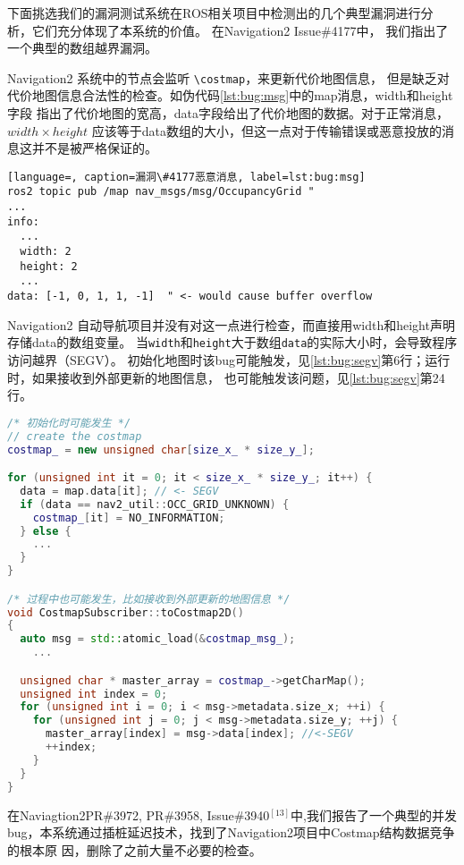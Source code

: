下面挑选我们的漏洞测试系统在ROS相关项目中检测出的几个典型漏洞进行分析，它们充分体现了本系统的价值。
在Navigation2 Issue\#4177中，
我们指出了一个典型的数组越界漏洞。

Navigation2 系统中的节点会监听 \texttt{\textbackslash costmap}，来更新代价地图信息，
但是缺乏对代价地图信息合法性的检查。如伪代码\ref{lst:bug:msg}中的map消息，width和height字段
指出了代价地图的宽高，data字段给出了代价地图的数据。对于正常消息，$width\times height$ 
应该等于data数组的大小，但这一点对于传输错误或恶意投放的消息这并不是被严格保证的。

\begin{lstlisting}[language=, caption=漏洞\#4177恶意消息, label=lst:bug:msg]
ros2 topic pub /map nav_msgs/msg/OccupancyGrid "
...
info:
  ...
  width: 2
  height: 2
  ...
data: [-1, 0, 1, 1, -1]  " <- would cause buffer overflow
\end{lstlisting}

Navigation2 自动导航项目并没有对这一点进行检查，而直接用width和height声明存储data的数组变量。
当\texttt{width}和\texttt{height}大于数组\texttt{data}的实际大小时，会导致程序访问越界（SEGV）。
初始化地图时该bug可能触发，见\ref{lst:bug:segv}第6行；运行时，如果接收到外部更新的地图信息，
也可能触发该问题，见\ref{lst:bug:segv}第24行。

\begin{lstlisting}[language=C++, caption=漏洞\#4177问题代码, label=lst:bug:segv]
/* 初始化时可能发生 */
// create the costmap
costmap_ = new unsigned char[size_x_ * size_y_];

for (unsigned int it = 0; it < size_x_ * size_y_; it++) {
  data = map.data[it]; // <- SEGV
  if (data == nav2_util::OCC_GRID_UNKNOWN) {
    costmap_[it] = NO_INFORMATION;
  } else {
    ...
  }
}

/* 过程中也可能发生，比如接收到外部更新的地图信息 */
void CostmapSubscriber::toCostmap2D()
{
  auto msg = std::atomic_load(&costmap_msg_);
	...

  unsigned char * master_array = costmap_->getCharMap();
  unsigned int index = 0;
  for (unsigned int i = 0; i < msg->metadata.size_x; ++i) {
    for (unsigned int j = 0; j < msg->metadata.size_y; ++j) {
      master_array[index] = msg->data[index]; //<-SEGV
      ++index;
    }
  }
}
\end{lstlisting}

在Naviagtion2PR\#3972, PR\#3958, Issue\#3940$^{[13]}$中,我们报告了一个典型的并发
bug，本系统通过插桩延迟技术，找到了Navigation2项目中Costmap结构数据竞争的根本原
因，删除了之前大量不必要的检查。

